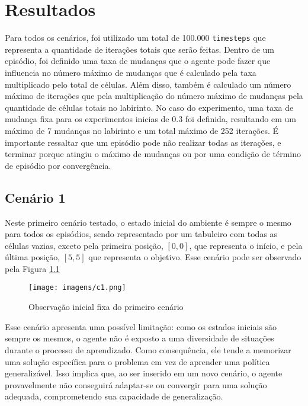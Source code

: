 \chapter{Resultados}

Para todos os cenários, foi utilizado um total de 100.000 \texttt{timesteps} que representa
a quantidade de iterações totais que serão feitas. Dentro de um episódio, foi definido
uma taxa de mudanças que o agente pode fazer que influencia no número máximo de mudanças
que é calculado pela taxa multiplicado pelo total de células. Além disso, também é calculado um número máximo de 
iterações que pela multiplicação do número máximo de mudanças pela
quantidade de células totais no labirinto. No caso do experimento, uma taxa de mudança fixa
para os experimentos inicias de 0.3 foi definida, resultando em um máximo de 7 mudanças no
labirinto e um total máximo de 252 iterações. É importante ressaltar que um episódio pode não
realizar todas as iterações, e terminar porque atingiu o máximo de mudanças ou
por uma condição de término de episódio por convergência.


\section{Cenário 1}
Neste primeiro cenário testado, o estado inicial do ambiente é sempre o mesmo para 
todos os episódios, sendo representado por um tabuleiro com todas as células vazias,
exceto pela primeira posição, \([0,0]\), que representa o início, e pela última
posição, \([5,5]\) que representa o objetivo. Esse cenário pode ser observado 
pela Figura \ref{c1}

\begin{figure}[htb]
	\caption{\label{c1}Observação inicial fixa do primeiro cenário}
	\begin{center}
	    \texttt{[image: imagens/c1.png]}
	\end{center}
\end{figure}

\FloatBarrier

Esse cenário apresenta uma possível limitação: como os estados iniciais são sempre os mesmos, 
o agente não é exposto a uma diversidade de situações durante o processo de aprendizado. 
Como consequência, ele tende a memorizar uma solução específica para o problema em vez de aprender uma 
política generalizável. Isso implica que, ao ser inserido em um novo cenário, o agente provavelmente 
não conseguirá adaptar-se ou convergir para uma solução adequada, comprometendo sua capacidade de generalização.

